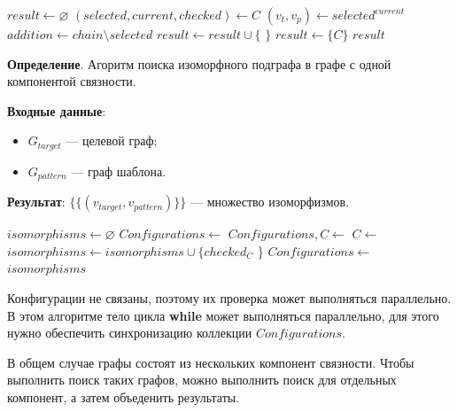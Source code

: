 \begin{algorithmic}
\State $result \gets \varnothing$
\State $(selected, current, checked) \gets C$
\State $(v_t, v_p) \gets selected^{current}$
    \State $addition \gets chain \setminus selected$
        \State $result \gets result \cup \{ $  $ \}$
    \EndIf
\EndFor
{}
    \State $result \gets \{ C \}$
\EndIf
\State \Return $result$
\EndFunction
\end{algorithmic}

\textbf{Определение}. Агоритм поиска изоморфного подграфа в графе с одной
компонентой связности.

\textbf{Входные данные}:
\begin{itemize}
\item $G_{target}$ --- целевой граф;
\item $G_{pattern}$ --- граф шаблона.
\end{itemize}

\textbf{Результат}: $\{ \{ ( v_{target}, v_{pattern} ) \} \}$ --- множество
изоморфизмов.

\begin{algorithmic}
    \State $isomorphisms \gets \varnothing$
    \State $Configurations \gets$ 
        \State $Configurations, C \gets$ 
        \State $C \gets$ 
                \State $isomorphisms \gets isomorphisms \cup \{ checked_C$ \}
            \EndIf
        \Else
            \State $Configurations \gets$ 
        \EndIf
    \EndWhile
    \State \Return $isomorphisms$
\EndFunction
\end{algorithmic}

Конфигурации не связаны, поэтому их проверка может выполняться параллельно.
В этом алгоритме тело цикла \textbf{while} может выполняться параллельно,
для этого нужно обеспечить синхронизацию коллекции $Configurations$.

В общем случае графы состоят из нескольких компонент связности.
Чтобы выполнить поиск таких графов, можно выполнить поиск для отдельных компонент,
а затем объеденить результаты.

